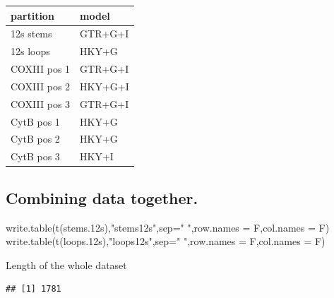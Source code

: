 \documentclass[
]{article}
\newenvironment{Shaded}{\begin{snugshade}}{\end{snugshade}}
\newcommand{\AttributeTok}[1]{\textcolor[rgb]{0.77,0.63,0.00}{#1}}
\newcommand{\DecValTok}[1]{\textcolor[rgb]{0.00,0.00,0.81}{#1}}
\newcommand{\FloatTok}[1]{\textcolor[rgb]{0.00,0.00,0.81}{#1}}
\newcommand{\FunctionTok}[1]{\textcolor[rgb]{0.00,0.00,0.00}{#1}}
\newcommand{\NormalTok}[1]{#1}
\newcommand{\OtherTok}[1]{\textcolor[rgb]{0.56,0.35,0.01}{#1}}
\newcommand{\SpecialCharTok}[1]{\textcolor[rgb]{0.00,0.00,0.00}{#1}}
\newcommand{\StringTok}[1]{\textcolor[rgb]{0.31,0.60,0.02}{#1}}
\begin{document}
\begin{longtable}[]{@{}ll@{}}
\toprule()
partition & model \\
\midrule()
\endhead
12s stems & GTR+G+I \\
12s loops & HKY+G \\
COXIII pos 1 & GTR+G+I \\
COXIII pos 2 & HKY+G+I \\
COXIII pos 3 & GTR+G+I \\
CytB pos 1 & HKY+G \\
CytB pos 2 & HKY+G \\
CytB pos 3 & HKY+I \\
\bottomrule()
\end{longtable}

\hypertarget{combining-data-together.}{%
\subsection{Combining data together.}\label{combining-data-together.}}

\begin{Shaded}
\begin{Highlighting}[]
\FunctionTok{write.table}\NormalTok{(}\FunctionTok{t}\NormalTok{(stems}\FloatTok{.12}\NormalTok{s),}\StringTok{"stems12s"}\NormalTok{,}\AttributeTok{sep=}\StringTok{" "}\NormalTok{,}\AttributeTok{row.names =}\NormalTok{ F,}\AttributeTok{col.names =}\NormalTok{ F)}
\FunctionTok{write.table}\NormalTok{(}\FunctionTok{t}\NormalTok{(loops}\FloatTok{.12}\NormalTok{s),}\StringTok{"loops12s"}\NormalTok{,}\AttributeTok{sep=}\StringTok{" "}\NormalTok{,}\AttributeTok{row.names =}\NormalTok{ F,}\AttributeTok{col.names =}\NormalTok{ F)}
\end{Highlighting}
\end{Shaded}

Length of the whole dataset

\begin{Shaded}
\end{Shaded}

\begin{verbatim}
## [1] 1781
\end{verbatim}
\end{document}
